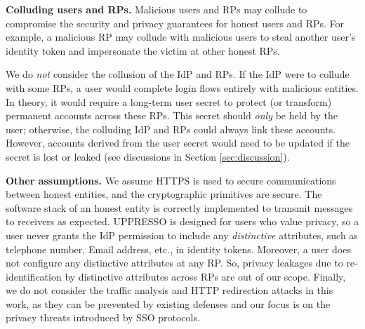 \noindent \textbf{Colluding users and RPs.}
Malicious users and RPs may collude to compromise the security and privacy guarantees for honest users and RPs. For example, a malicious RP may collude with malicious users to steal another user's identity token and impersonate the victim at other honest RPs.

We do \emph{not} consider the collusion of the IdP and RPs. If the IdP were to collude with some RPs, a user would complete login flows entirely with malicious entities. In theory, it would require a long-term user secret to protect (or transform) permanent accounts across these RPs. This secret should \emph{only} be held  by the user; otherwise, the colluding IdP and RPs could always link these accounts.
However, accounts derived from the user secret would need to be updated if the secret is lost or leaked (see discussions in Section \ref{sec:discussion}).

\noindent \textbf{Other assumptions.} 
We assume HTTPS is used to secure communications between honest entities, and the cryptographic primitives are secure. The software stack of an honest entity is correctly implemented to transmit messages to receivers as expected. 
UPPRESSO is designed for users who value privacy,
so a user never grants the IdP permission to include any \emph{distinctive} attributes, such as telephone number, Email address, etc., in identity tokens. Moreover, a user does not configure any distinctive attributes at any RP. So, privacy leakages due to re-identification by distinctive attributes across RPs are out of our scope. Finally, we do not consider the traffic analysis and HTTP redirection attacks in this work, as they can be prevented by existing defenses and our focus is on the privacy threats introduced by SSO protocols. 


